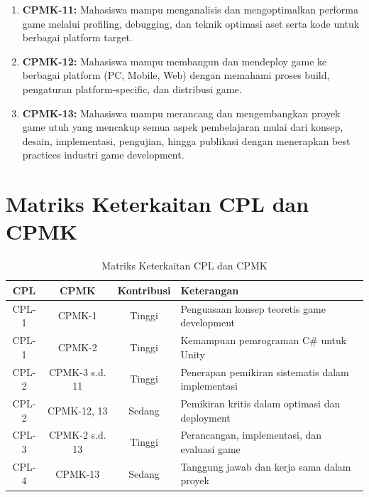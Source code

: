 \begin{enumerate}
  \item \textbf{CPMK-11:} Mahasiswa mampu menganalisis dan mengoptimalkan performa game melalui profiling, debugging, dan teknik optimasi aset serta kode untuk berbagai platform target.
  
  \item \textbf{CPMK-12:} Mahasiswa mampu membangun dan mendeploy game ke berbagai platform (PC, Mobile, Web) dengan memahami proses build, pengaturan platform-specific, dan distribusi game.
  
  \item \textbf{CPMK-13:} Mahasiswa mampu merancang dan mengembangkan proyek game utuh yang mencakup semua aspek pembelajaran mulai dari konsep, desain, implementasi, pengujian, hingga publikasi dengan menerapkan best practices industri game development.
\end{enumerate}

\section*{Matriks Keterkaitan CPL dan CPMK}

\begin{table}[h]
\centering
\small
\begin{tabular}{|c|c|c|p{4.5cm}|}
  \hline
  \textbf{CPL} & \textbf{CPMK} & \textbf{Kontribusi} & \textbf{Keterangan} \\
  \hline
  CPL-1 & CPMK-1 & Tinggi & Penguasaan konsep teoretis game development \\
  \hline
  CPL-1 & CPMK-2 & Tinggi & Kemampuan pemrograman C\# untuk Unity \\
  \hline
  CPL-2 & CPMK-3 s.d. 11 & Tinggi & Penerapan pemikiran sistematis dalam implementasi \\
  \hline
  CPL-2 & CPMK-12, 13 & Sedang & Pemikiran kritis dalam optimasi dan deployment \\
  \hline
  CPL-3 & CPMK-2 s.d. 13 & Tinggi & Perancangan, implementasi, dan evaluasi game \\
  \hline
  CPL-4 & CPMK-13 & Sedang & Tanggung jawab dan kerja sama dalam proyek \\
  \hline
\end{tabular}
\caption{Matriks Keterkaitan CPL dan CPMK}
\end{table}

\cleardoublepage

{}
\tableofcontents
\cleardoublepage

\clearpage
{}
{}
\listoffigures
\cleardoublepage

{}
\listoftables
\cleardoublepage

{}
\lstlistoflistings
\cleardoublepage
